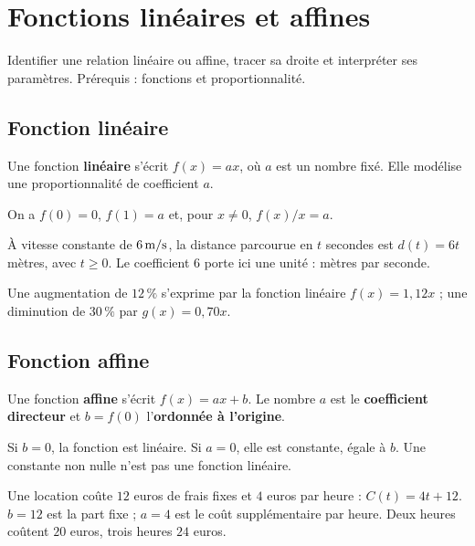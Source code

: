 \documentclass[../cours_3e.tex]{subfiles}
\begin{document}
\setcounter{chapter}{8}
\chapter{Fonctions linéaires et affines}
\label{ch:affines}
\begin{objectif}
Identifier une relation linéaire ou affine, tracer sa droite et interpréter ses paramètres. Prérequis : fonctions et proportionnalité.
\end{objectif}
\section{Fonction linéaire}
\begin{definition}
Une fonction \textbf{linéaire} s'écrit $f(x)=ax$, où $a$ est un nombre fixé. Elle modélise une proportionnalité de coefficient $a$.
\end{definition}
On a $f(0)=0$, $f(1)=a$ et, pour $x\ne0$, $f(x)/x=a$.
\begin{exemple}
À vitesse constante de $6\,\mathrm{m/s}$, la distance parcourue en $t$ secondes est $d(t)=6t$ mètres, avec $t\geq0$. Le coefficient $6$ porte ici une unité : mètres par seconde.
\end{exemple}
Une augmentation de $12\,\%$ s'exprime par la fonction linéaire $f(x)=1{,}12x$ ; une diminution de $30\,\%$ par $g(x)=0{,}70x$.
\section{Fonction affine}
\begin{definition}
Une fonction \textbf{affine} s'écrit $f(x)=ax+b$. Le nombre $a$ est le \textbf{coefficient directeur} et $b=f(0)$ l'\textbf{ordonnée à l'origine}.
\end{definition}
Si $b=0$, la fonction est linéaire. Si $a=0$, elle est constante, égale à $b$. Une constante non nulle n'est pas une fonction linéaire.
\begin{exemple}
Une location coûte $12$ euros de frais fixes et $4$ euros par heure : $C(t)=4t+12$. $b=12$ est la part fixe ; $a=4$ est le coût supplémentaire par heure. Deux heures coûtent $20$ euros, trois heures $24$ euros.
\end{exemple}
\end{document}
